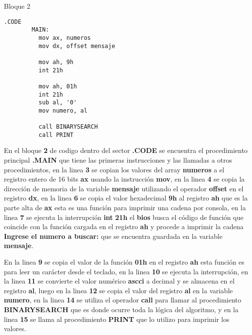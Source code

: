 \documentclass[a4paper,twoside]{article}
\newcommand{\codebordo}[1]{\textcolor{codebordo}{#1}}
\newcommand{\codeblue}[1]{\textcolor{codeblue}{#1}}
\newcommand{\codepurple}[1]{\textcolor{codepurple}{#1}}
\begin{document}
    \vspace*{-1cm}
    \begin{center}
      {\normalsize Bloque 2}
      \begin{lstlisting}[language=8086]
      .CODE
        MAIN:
          mov ax, numeros
          mov dx, offset mensaje
         
          mov ah, 9h
          int 21h
    
          mov ah, 01h
          int 21h
          sub al, '0'
          mov numero, al
    
          call BINARYSEARCH
          call PRINT
      \end{lstlisting}
    \end{center} 
    \vspace*{0.5cm}
      {\Large 
        En el bloque \textbf{2} de codigo dentro del sector \codeblue{\textbf{.CODE}} se encuentra el procedimiento principal \codeblue{\textbf{.MAIN}}
        que tiene las primeras instrucciones y las llamadas a otros procedimientos, en la linea \textbf{3} se copian 
        los valores del array \textbf{numeros} a el registro entero de 16 bits \codebordo{\textbf{ax}} usando la instrucción 
        \codeblue{\textbf{mov}}, en la linea \textbf{4} se copia la dirección de memoria de la variable \textbf{mensaje}
        utilizando el operador \codeblue{\textbf{offset}} en el registro \codebordo{\textbf{dx}}, en la linea \textbf{6} se copia el valor 
        hexadecimal \textbf{9h} al registro \codebordo{\textbf{ah}} que es la parte alta de \codebordo{\textbf{ax}} esta es una función para 
        imprimir una cadena por consola, en la linea \textbf{7} se ejecuta la interrupción \codeblue{\textbf{int}} \textbf{21h} el \textbf{bios}
        busca el código de función que coincide con la función cargada en el registro \codebordo{\textbf{ah}} y procede a imprimir la cadena 
        \codepurple{\textbf{Ingrese el numero a buscar:}} que se encuentra guardada en la variable \textbf{mensaje}. 
      }
      \par
      {\Large En la linea \textbf{9} se copia el valor de la función \textbf{01h} en el registro \codebordo{\textbf{ah}} esta función es para 
        leer un carácter desde el teclado, en la linea \textbf{10} se ejecuta la interrupción, en la linea \textbf{11} se convierte el valor 
        numérico \textbf{ascci} a decimal y se almacena en el registro \codebordo{\textbf{al}}, 
        luego en la linea \textbf{12} se copia el valor del registro \codebordo{\textbf{al}} en la variable \textbf{numero}, 
        en la linea \textbf{14} se utiliza el operador \codeblue{\textbf{call}} para llamar al procedimiento \codeblue{\textbf{BINARYSEARCH}} 
        que es donde ocurre toda la lógica del algoritmo, y en la linea \textbf{15} se llama al procedimiento \codeblue{\textbf{PRINT}} 
        que lo utilizo para imprimir los valores.
      }
\end{document}

